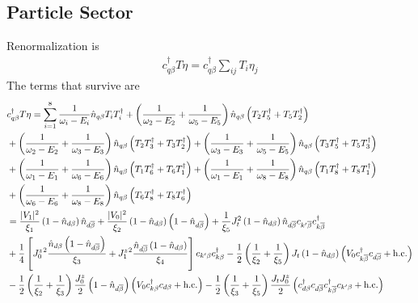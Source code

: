 \documentclass[12pt,twoside]{article}
\numberwithin{equation}{section}
\begin{document}
{\subsection{Particle Sector}
Renormalization is
\begin{equation}\begin{aligned}
	c^\dagger_{q\beta}T \eta = c^\dagger_{q\beta}\sum_{ij}T_i \eta_j
\end{aligned}\end{equation}
The terms that survive are
\begin{equation}\begin{aligned}
& c^\dagger_{q\beta}T \eta
= \sum_{i=1}^8\frac{1}{\omega_i - E_i}\hat n_{q\beta} T_i T_i^\dagger +\left(\frac{1}{\omega_2 - E_2} + \frac{1}{\omega_5 - E_5}\right)\hat n_{q\beta} \left(T_2 T_5^\dagger + T_5 T_2^\dagger \right) \\
& +\left(\frac{1}{\omega_2 - E_2} + \frac{1}{\omega_3 - E_3}\right)\hat n_{q\beta} \left(T_2 T_3^\dagger + T_3 T_2^\dagger \right) + \left(\frac{1}{\omega_3 - E_3} + \frac{1}{\omega_5 - E_5}\right)\hat n_{q\beta} \left(T_3 T_5^\dagger + T_5 T_3^\dagger \right) \\
& + \left(\frac{1}{\omega_1 - E_1} + \frac{1}{\omega_6 - E_6}\right)\hat n_{q\beta} \left(T_1 T_6^\dagger + T_6 T_1^\dagger \right) + \left(\frac{1}{\omega_1 - E_1} + \frac{1}{\omega_8 - E_8}\right)\hat n_{q\beta} \left(T_1 T_8^\dagger + T_8 T_1^\dagger \right) \\
& + \left(\frac{1}{\omega_6 - E_6} + \frac{1}{\omega_8 - E_8}\right)\hat n_{q\beta} \left(T_6 T_8^\dagger + T_8 T_6^\dagger \right)\\
&=\frac{|V_1|^2}{\xi_1}\left( 1 - \hat n_{d\beta} \right) \hat n_{d\ol\beta} + \frac{|V_0|^2}{\xi_2}\left( 1 - \hat n_{d\beta} \right) \left( 1 - \hat n_{d\ol\beta} \right) + \frac{1}{\xi_5}J_t^2 \left( 1 - \hat n_{d\beta} \right) \hat n_{d\ol\beta} c_{k^\prime\ol\beta}c^\dagger_{k\ol\beta} \\
&+ \frac{1}{4}\left[ {J_0^z}^2\frac{\hat n_{d\beta}\left( 1 - \hat n_{d\ol\beta} \right) }{\xi_3} + {J_1^z}^2\frac{\hat n_{d\ol\beta}\left( 1 - \hat n_{d\beta} \right)}{\xi_4} \right]c_{k^\prime\beta}c^\dagger_{k\beta} - \frac{1}{2} \left(\frac{1}{\xi_2} + \frac{1}{\xi_5}\right)J_t\left( 1 - \hat n_{d\beta}\right) \left(V_0 c^\dagger_{k\ol\beta}c_{d\ol\beta} + \text{h.c.}\right) \\
&- \frac{1}{2}\left(\frac{1}{\xi_2} + \frac{1}{\xi_3}\right)\frac{J^z_0}{2}\left(1 - \hat n_{d\ol\beta}\right)\left(V_0 c^\dagger_{k\beta}c_{d\beta} + \text{h.c.}\right) - \frac{1}{2}\left(\frac{1}{\xi_3} + \frac{1}{\xi_5}\right)\frac{J_t J^z_0}{2}\left(c^\dagger_{d\beta}c_{d\ol\beta}c^\dagger_{k\ol\beta}c_{k^\prime\beta} + \text{h.c.}\right) \\

\end{aligned}
\end{equation}}
\end{document}
